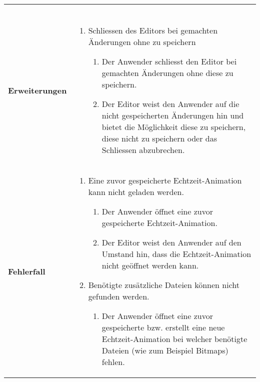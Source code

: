 \begin{longtabu}{p{0.5\textwidth}p{0.5\textwidth}}
\begin{enumerate}
        \end{enumerate} \\
    \cmidrule(r){1-1}\cmidrule(lr){2-2}
        \textbf{Erweiterungen} &
        \begin{enumerate}[label= (\alph*)]
            \item{Schliessen des Editors bei gemachten Änderungen ohne zu
                    speichern
                \begin{enumerate}[label= (\roman*)]
                    \item{Der Anwender schliesst den Editor bei gemachten
                            Änderungen ohne diese zu speichern.}
                    \item{Der Editor weist den Anwender auf die
                            nicht gespeicherten Änderungen hin und bietet
                            die Möglichkeit diese zu speichern, diese nicht
                            zu speichern oder das Schliessen abzubrechen.}
                \end{enumerate}
            }
        \end{enumerate}\\
    \cmidrule(r){1-1}\cmidrule(lr){2-2}
        \textbf{Fehlerfall} &
        \begin{enumerate}[label= (\alph*)]
            \item{Eine zuvor gespeicherte Echtzeit-Animation kann nicht
                    geladen werden.
                \begin{enumerate}[label= (\roman*)]
                    \item{Der Anwender öffnet eine zuvor gespeicherte
                            Echtzeit-Animation.}
                    \item{Der Editor weist den Anwender auf den Umstand
                            hin, dass die Echtzeit-Animation nicht geöffnet
                            werden kann.}
                \end{enumerate}
            }
            \item{Benötigte zusätzliche Dateien können nicht gefunden
                    werden.
                \begin{enumerate}[label= (\roman*)]
                    \item{Der Anwender öffnet eine zuvor gespeicherte bzw.
                            erstellt eine neue Echtzeit-Animation bei
                            welcher benötigte Dateien (wie zum Beispiel
                            Bitmaps) fehlen.}

\end{enumerate}}
\end{enumerate}
\end{longtabu}
